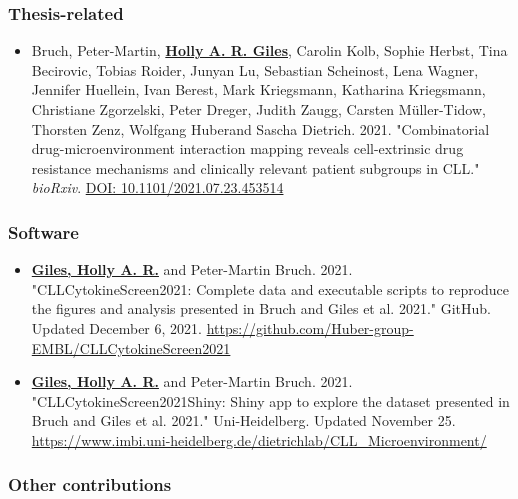 \documentclass[11pt, a4paper, twosided]{book}
\begin{document}
    \hypertarget{thesis-related}{%
    \subsubsection*{Thesis-related}\label{thesis-related}}
    \begin{itemize}
        \item Bruch, Peter-Martin\ast,  \textbf{\underline{Holly A. R. Giles}}\ast, Carolin Kolb, Sophie Herbst, Tina Becirovic, Tobias Roider, Junyan Lu, Sebastian Scheinost, Lena Wagner, Jennifer Huellein, Ivan Berest, Mark Kriegsmann, Katharina Kriegsmann, Christiane Zgorzelski, Peter Dreger, Judith Zaugg, Carsten Müller-Tidow, Thorsten Zenz, Wolfgang Huber\ast  and Sascha Dietrich\ast. 2021. "Combinatorial drug-microenvironment interaction mapping reveals cell-extrinsic drug resistance mechanisms and clinically relevant patient subgroups in CLL." \textit{bioRxiv}. \href{https://doi.org/10.1101/2021.07.23.453514}{DOI: 10.1101/2021.07.23.453514} 
        
    \end{itemize}
    \hypertarget{software}{%
    \subsubsection{Software}\label{software}}
    \begin{itemize}
      \item \textbf{\underline{Giles, Holly A. R.}} and Peter-Martin Bruch. 2021. "CLLCytokineScreen2021: Complete data and executable scripts to reproduce the figures and analysis presented in Bruch and Giles et al. 2021." GitHub. Updated December 6, 2021. \href{https://github.com/Huber-group-EMBL/CLLCytokineScreen2021}{https://github.com/Huber-group-EMBL/CLLCytokineScreen2021}
      
       \item \textbf{\underline{Giles, Holly A. R.}} and Peter-Martin Bruch. 2021. "CLLCytokineScreen2021Shiny: Shiny app to explore the dataset presented in Bruch and Giles et al. 2021." Uni-Heidelberg. Updated November 25. \href{https://www.imbi.uni-heidelberg.de/dietrichlab/CLL_Microenvironment/}{https://www.imbi.uni-heidelberg.de/dietrichlab/CLL_Microenvironment/} 
    \end{itemize}
    \hypertarget{other-contributions}{%
    \subsubsection*{Other contributions}\label{other-contributions}}
\end{document}
